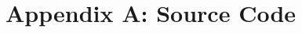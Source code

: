 \documentclass[main.tex]{subfiles}
\begin{document}
	\chapter{Appendix A: Source Code}
	
	
\end{document}
